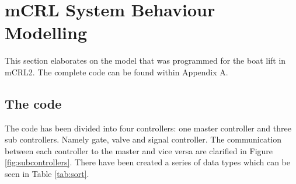 \section{mCRL System Behaviour Modelling}
This section elaborates on the model that was programmed for the boat lift in mCRL2. The complete code can be found within Appendix A.
\subsection{The code}
The code has been divided into four controllers: one master controller and three sub controllers. Namely gate, valve and signal controller. The communication between each controller to the master and vice versa are clarified in Figure \ref{fig:subcontrollers}.
There have been created a series of data types which can be seen in Table \ref{tab:sort}.

